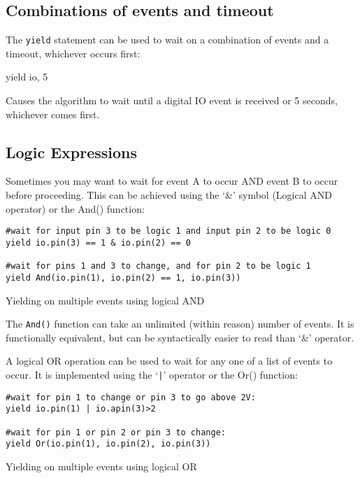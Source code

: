\documentclass[a4paper, 12pt]{article}
\begin{document}
\subsection{Combinations of events and timeout}
The \texttt{yield} statement can be used to wait on a combination of events and
a timeout, whichever occurs first:

\begin{verbatimtab}
yield io, 5
\end{verbatimtab}

Causes the algorithm to wait until a digital IO event is received or 5 seconds,
whichever comes first.


\subsection{Logic Expressions}
Sometimes you may want to wait for event A to occur AND event B to occur before proceeding. This can be achieved using the `\&' symbol (Logical AND operator) or the And() function:
\begin{python}
\begin{verbatim}
#wait for input pin 3 to be logic 1 and input pin 2 to be logic 0
yield io.pin(3) == 1 & io.pin(2) == 0

#wait for pins 1 and 3 to change, and for pin 2 to be logic 1
yield And(io.pin(1), io.pin(2) == 1, io.pin(3)) 
\end{verbatim}
\caption{\label{py:yieldand}Yielding on multiple events using logical AND}
\end{python}

The \texttt{And()} function can take an unlimited (within reason) number of events. It is functionally equivalent, but can be syntactically easier to read than `\&' operator.

\vspace{12pt}

A logical OR operation can be used to wait for any one of a list of events to occur. It is implemented using the `\texttt{|}' operator or the Or() function:
\begin{python}
\begin{verbatim}
#wait for pin 1 to change or pin 3 to go above 2V:
yield io.pin(1) | io.apin(3)>2

#wait for pin 1 or pin 2 or pin 3 to change:
yield Or(io.pin(1), io.pin(2), io.pin(3))
\end{verbatim}
\caption{\label{py:yieldor}Yielding on multiple events using logical OR}
\end{python}
\end{document}

